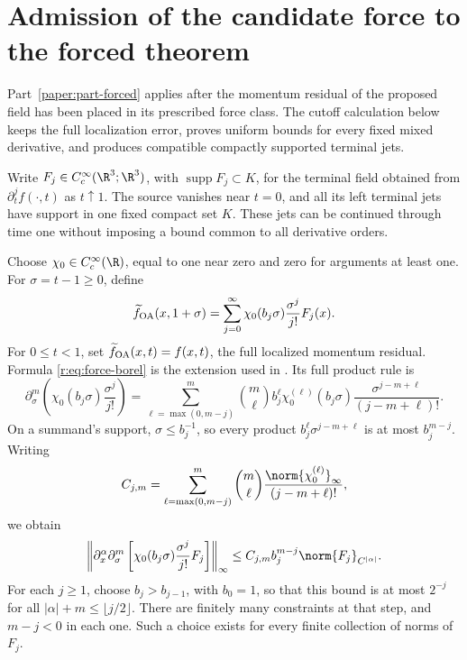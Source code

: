 \section{Admission of the candidate force to the forced theorem}
\label{r:sec:force-extension}

Part~\ref{paper:part-forced} applies after the momentum residual of the proposed field has been
placed in its prescribed force class. The cutoff calculation below keeps the
full localization error, proves uniform bounds for every fixed mixed
derivative, and produces compatible compactly supported terminal jets.



Write \(F_j\in C_c^\infty(\R^3;\R^3)\), with
\(\operatorname{supp}F_j\subset K\), for the terminal field obtained from
\(\partial_t^j f(\cdot,t)\) as \(t\uparrow1\). The source vanishes near
\(t=0\), and all its left terminal jets have support in one fixed compact
set \(K\). These jets can be continued through time one without imposing a
bound common to all derivative orders.

Choose \(\chi_0\in C_c^\infty(\R)\), equal to one near zero and zero for
arguments at least one. For \(\sigma=t-1\ge0\), define
\begin{equation}
 \widetilde f_{\rm OA}(x,1+\sigma)=\sum_{j=0}^\infty
 \chi_0(b_j\sigma)\frac{\sigma^j}{j!}F_j(x).
 \label{r:eq:force-borel}
\end{equation}
For \(0\le t<1\), set \(\widetilde f_{\rm OA}(x,t)=f(x,t)\), the full
localized momentum residual. Formula \eqref{r:eq:force-borel} is the
extension used in \cite[(10.11)]{openai-paper}. Its full product rule is
\[
 \partial_\sigma^m
 \left(\chi_0(b_j\sigma)\frac{\sigma^j}{j!}\right)
 =\sum_{\ell=\max(0,m-j)}^m
 \binom m\ell b_j^\ell\chi_0^{(\ell)}(b_j\sigma)
 \frac{\sigma^{j-m+\ell}}{(j-m+\ell)!}.
\]
On a summand's support, \(\sigma\le b_j^{-1}\), so every product
\(b_j^\ell\sigma^{j-m+\ell}\) is at most \(b_j^{m-j}\). Writing
\[
 C_{j,m}=\sum_{\ell=\max(0,m-j)}^m
 \binom m\ell\frac{\norm{\chi_0^{(\ell)}}_\infty}{(j-m+\ell)!},
\]
we obtain
\begin{equation}
 \left\|\partial_x^\alpha\partial_\sigma^m
 \left[\chi_0(b_j\sigma)\frac{\sigma^j}{j!}F_j\right]\right\|_\infty
 \le C_{j,m}b_j^{m-j}\norm{F_j}_{C^{|\alpha|}}.
 \label{r:eq:force-borel-bound}
\end{equation}
For each \(j\ge1\), choose \(b_j>b_{j-1}\), with \(b_0=1\), so that
this bound is at most \(2^{-j}\) for all
\(|\alpha|+m\le\lfloor j/2\rfloor\). There are finitely many constraints at
that step, and \(m-j<0\) in each one. Such a choice exists for every finite
collection of norms of \(F_j\).

